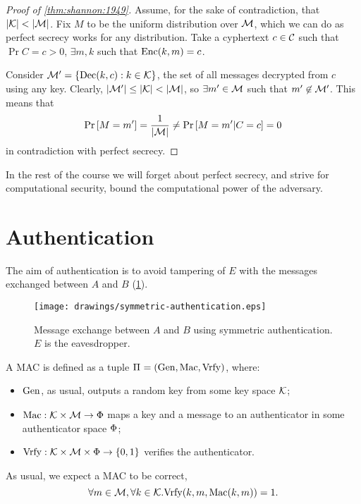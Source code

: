 \begin{proof}[Proof of \cref{thm:shannon:1949}]
	Assume, for the sake of contradiction, that $\left|{\mathcal{K}}\right| < \left|{\mathcal{M}}\right|$.
	Fix $M$ to be the uniform distribution over $\mathcal{M}$, which we can do as perfect secrecy works for any distribution.
	Take a cyphertext $c \in \mathcal{C}$ such that $\Pr{C = c} > 0$, \ie $\exists m, k$ such that $\mathrm{Enc}(k,m) = c$.

	Consider $\mathcal{M}' = \{ \mathrm{Dec}(k,c) : k \in \mathcal{K} \}$, the set of all messages decrypted from $c$ using any key.
	Clearly, $\left|{\mathcal{M}'}\right| \le \left|{\mathcal{K}}\right| < \left|{\mathcal{M}}\right|$, so $\exists m' \in \mathcal{M}$ such that $m' \not\in \mathcal{M}'$.
	This means that
	\begin{equation*}
		\mathop{\mathrm{Pr}}\limits_{} \left[ {M = m'} \right] = \frac{1}{\left|{\mathcal{M}}\right|} \neq \mathop{\mathrm{Pr}}\limits_{} \left[ {M = m' | C = c} \right] = 0
	\end{equation*}
	in contradiction with perfect secrecy.
\end{proof}

In the rest of the course we will forget about perfect secrecy, and strive for computational security, \ie bound the computational power of the adversary.

\section{Authentication}

The aim of authentication is to avoid tampering of $E$ with the messages exchanged between $A$ and $B$ (\cref{fig:symmetric-authentication}).

\begin{figure}
	\centering
	\texttt{[image: drawings/symmetric-authentication.eps]}
	\caption{Message exchange between $A$ and $B$ using symmetric authentication. $E$ is the eavesdropper.}
	\label{fig:symmetric-authentication}
\end{figure}

A \ac{MAC} is defined as a tuple $\Pi_{} = \left( \mathrm{Gen}, \allowbreak \mathrm{Mac}, \allowbreak \mathrm{Vrfy} \right)$, where:
\begin{itemize}
	\item $\mathrm{Gen}$, as usual, outputs a random key from some key space $\mathcal{K}$;
	\item $\mathrm{Mac} : \mathcal{K} \times \mathcal{M} \to \Phi$ maps a key and a message to an authenticator in some authenticator space $\Phi$;
	\item $\mathrm{Vrfy} : \mathcal{K} \times \mathcal{M} \times \Phi \to \{0,1\}$ verifies the authenticator.
\end{itemize}
As usual, we expect a \ac{MAC} to be correct, \ie
\begin{equation*}
	\forall m \in \mathcal{M}, \forall k \in \mathcal{K} . \mathrm{Vrfy}(k, m, \mathrm{Mac}(k, m)) = 1.
\end{equation*}


